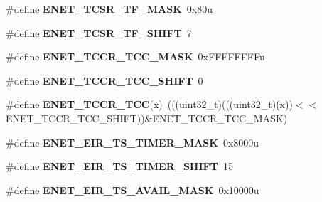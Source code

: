 \begin{DoxyCompactItemize}
\item 
\#define {\bfseries E\+N\+E\+T\+\_\+\+T\+C\+S\+R\+\_\+\+T\+F\+\_\+\+M\+A\+SK}~0x80u\hypertarget{group__ENET__Register__Masks_ga79d70e9a593487d29ce2e6b9c9021c59}{}\label{group__ENET__Register__Masks_ga79d70e9a593487d29ce2e6b9c9021c59}

\item 
\#define {\bfseries E\+N\+E\+T\+\_\+\+T\+C\+S\+R\+\_\+\+T\+F\+\_\+\+S\+H\+I\+FT}~7\hypertarget{group__ENET__Register__Masks_gaa0ab6243262f645ae70f481ba9c33203}{}\label{group__ENET__Register__Masks_gaa0ab6243262f645ae70f481ba9c33203}

\item 
\#define {\bfseries E\+N\+E\+T\+\_\+\+T\+C\+C\+R\+\_\+\+T\+C\+C\+\_\+\+M\+A\+SK}~0x\+F\+F\+F\+F\+F\+F\+F\+Fu\hypertarget{group__ENET__Register__Masks_ga6f9999013e2cb91eaf8ebbdc67ca9fe8}{}\label{group__ENET__Register__Masks_ga6f9999013e2cb91eaf8ebbdc67ca9fe8}

\item 
\#define {\bfseries E\+N\+E\+T\+\_\+\+T\+C\+C\+R\+\_\+\+T\+C\+C\+\_\+\+S\+H\+I\+FT}~0\hypertarget{group__ENET__Register__Masks_ga72e171b218136489e1e0b5dcb7aefab7}{}\label{group__ENET__Register__Masks_ga72e171b218136489e1e0b5dcb7aefab7}

\item 
\#define {\bfseries E\+N\+E\+T\+\_\+\+T\+C\+C\+R\+\_\+\+T\+CC}(x)~(((uint32\+\_\+t)(((uint32\+\_\+t)(x))$<$$<$E\+N\+E\+T\+\_\+\+T\+C\+C\+R\+\_\+\+T\+C\+C\+\_\+\+S\+H\+I\+FT))\&E\+N\+E\+T\+\_\+\+T\+C\+C\+R\+\_\+\+T\+C\+C\+\_\+\+M\+A\+SK)\hypertarget{group__ENET__Register__Masks_ga7b276385d78bf216e8b3c0efb45d2f87}{}\label{group__ENET__Register__Masks_ga7b276385d78bf216e8b3c0efb45d2f87}

\item 
\#define {\bfseries E\+N\+E\+T\+\_\+\+E\+I\+R\+\_\+\+T\+S\+\_\+\+T\+I\+M\+E\+R\+\_\+\+M\+A\+SK}~0x8000u\hypertarget{group__ENET__Register__Masks_gabded92ce4206647b27b1107db2bb5088}{}\label{group__ENET__Register__Masks_gabded92ce4206647b27b1107db2bb5088}

\item 
\#define {\bfseries E\+N\+E\+T\+\_\+\+E\+I\+R\+\_\+\+T\+S\+\_\+\+T\+I\+M\+E\+R\+\_\+\+S\+H\+I\+FT}~15\hypertarget{group__ENET__Register__Masks_ga40800c9bb4d99721c93e7d7031f96300}{}\label{group__ENET__Register__Masks_ga40800c9bb4d99721c93e7d7031f96300}

\item 
\#define {\bfseries E\+N\+E\+T\+\_\+\+E\+I\+R\+\_\+\+T\+S\+\_\+\+A\+V\+A\+I\+L\+\_\+\+M\+A\+SK}~0x10000u\hypertarget{group__ENET__Register__Masks_gae746d0a643c9d6e39e07623a1d944acc}{}\label{group__ENET__Register__Masks_gae746d0a643c9d6e39e07623a1d944acc}


\end{DoxyCompactItemize}
